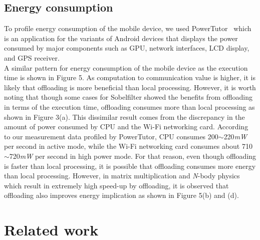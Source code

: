 \documentclass[conference]{IEEEtran}
\begin{document}
\subsection{Energy consumption}
To profile energy consumption of the mobile device, we used
PowerTutor~\cite{powertutor} which is an application for the variants of Android
devices that displays the power consumed by major components such as
GPU, network interfaces, LCD display, and GPS receiver.\\ 
%
\indent A similar pattern for energy consumption of the mobile device as
the execution time is shown in Figure 5.
%
As computation to communication value is higher, 
it is likely that offloading is more beneficial than local processing.
%
However, it is worth noting that though some cases for Sobelfilter
showed the benefits from offloading in terms of the execution time,
offloading consumes more than local processing as shown in Figure
3(a).
%
This dissimilar result comes from the discrepancy in the amount of power
consumed by CPU and the Wi-Fi networking card.
%
According to our measurement data profiled by PowerTutor, CPU consumes
200$\sim$220\textit{mW} per second in active mode, while the
Wi-Fi networking card consumes about 710$\sim$720\textit{mW}
per second in high power mode.
%
For that reason, even though offloading is faster than local processing,
it is possible that offloading consumes more energy than local
processing.
%
However, in matrix multiplication and \textit{N}-body physics which
result in extremely high speed-up by offloading, it is observed that
offloading also improves energy implication as shown in Figure 5(b) and
(d). 
%
\section{Related work}
\end{document}
